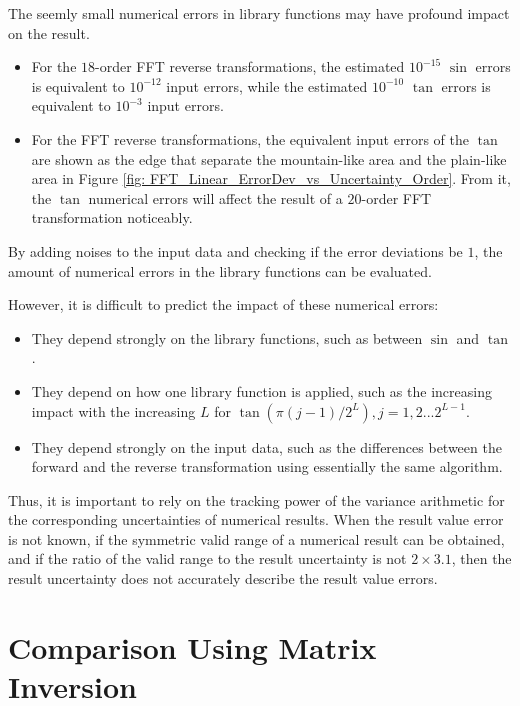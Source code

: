 \documentclass[twoside]{article}
\numberwithin{equation}{section}
\begin{document}
The seemly small numerical errors in library functions may have profound impact on the result.
\begin{itemize}
\item For the $18$-order FFT reverse transformations, the estimated $10^{-15}$ $\sin$ errors is equivalent to $10^{-12}$ input errors, while the estimated $10^{-10}$ $\tan$ errors is equivalent to $10^{-3}$ input errors. 

\item For the FFT reverse transformations, the equivalent input errors of the $\tan$ are shown as the edge that separate the mountain-like area and the plain-like area in Figure \ref{fig: FFT_Linear_ErrorDev_vs_Uncertainty_Order}. 
From it, the $\tan$ numerical errors will affect the result of a $20$-order FFT transformation noticeably. 

\end{itemize}
By adding noises to the input data and checking if the error deviations be $1$, the amount of numerical errors in the library functions can be evaluated.

However, it is difficult to predict the impact of these numerical errors: 
\begin{itemize}
\item They depend strongly on the library functions, such as between $\sin$ and $\tan$.

\item They depend on how one library function is applied, such as the increasing impact with the increasing $L$ for $\tan(\pi (j - 1) /2^L), j = 1, 2 ... 2^{L-1}$.

\item They depend strongly on the input data, such as the differences between the forward and the reverse transformation using essentially the same algorithm.

\end{itemize}
Thus, it is important to rely on the tracking power of the variance arithmetic for the corresponding uncertainties of numerical results.
When the result value error is not known, if the symmetric valid range of a numerical result can be obtained, and if the ratio of the valid range to the result uncertainty is not $2 \times 3.1$, then the result uncertainty does not accurately describe the result value errors.








\clearpage
\section{Comparison Using Matrix Inversion}
\label{sec: matrix}
\end{document}
